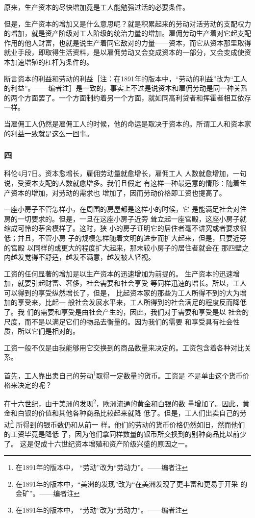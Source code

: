 \documentclass[a4paper,twoside,12pt,AutoFakeBold]{ctexart}
\begin{document}
原来，生产资本的尽快增加竟是工人能勉强过活的必要条件。

但是，生产资本的增加又是什么意思呢？就是积累起来的劳动对活劳动的支配权力的增加，就是资产阶级对工人阶级的统治力量的增加。雇佣劳动生产着对它起支配作用的他人财富，也就是说生产着同它敌对的力量——资本，而它从资本那里取得就业手段，即取得生活资料，是以雇佣劳动又会变成资本的一部分，又会变成使资本加速增殖的杠杆为条件的。

断言资本的利益和劳动的利益［注：在1891年的版本中，“劳动的利益”改为“工人的利益”。——编者注］是一致的，事实上不过是说资本和雇佣劳动是同一种关系的两个方面罢了。一个方面制约着另一个方面，就如同高利贷者和挥霍者相互依存一样。

当雇佣工人仍然是雇佣工人的时候，他的命运是取决于资本的。所谓工人和资本家的利益一致就是这么一回事。

\subsubsection{四}
科伦4月7日。资本愈增长，雇佣劳动量就愈增长，雇佣工人
人数就愈增加，一句说，受资本支配的人数就愈增多。我们且假定
有这样一种最适意的情形：随着生产资本的增加，对劳动的需求也
增加了，因而劳动价格即工资也提高了。

一座小房子不管怎样小，在周围的房屋都是这样小的时候，它
是能满足社会对住房的一切要求的。但是，一旦在这座小房子近旁
耸立起一座宫殿，这座小房子就缩成可怜的茅舍模样了。这时，狭
小的房子证明它的居住者毫不讲究或者要求很低；并且，不管小房
子的规模怎样随着文明的进步而扩大起来，但是，只要近旁的宫殿
以同样的或更大的程度扩大起来，那末较小房子的居住者就会在
那四壁之内越发觉得不舒适，越发不满意，越发被人轻视。

工资的任何显著的增加是以生产资本的迅速增加为前提的。
生产资本的迅速增加，就要引起财富、奢侈，社会需要和社会享受
等同样迅速的增长。所以，工人可以得到的享受纵然增长了，但是，
比起资本家的那些为工人所得不到的大为增加的享受来，比起一
般社会发展水平来，工人所得到的社会满足的程度反而降低了。我
们的需要和享受是由社会产生的，因此，我们对于需要和享受是以
社会的尺度，而不是以满足它们的物品去衡量的。因为我们的需要
和享受具有社会性质，所以它们是相对的。

工资一般不仅是由我能够用它交换到的商品数量来决定的。工资包含着各种对比关系。

首先，工人靠出卖自己的劳动\footnote{在1891年的版本中， “劳动”改为“劳动力”。——编者注}取得一定数量的货币。工资是
不是单由这个货币价格来决定的呢？

在十六世纪，由于美洲的发现\footnote{在1891年的版本中，“美洲的发现”改为“在美洲发现了更丰富和更易于开采
的金矿”。——编者注}，欧洲流通的黄金和白银的数
量增加了。因此，黄金和白银的价值和其他各种商品比较起来就降
低了。但是，工人们出卖自己的劳动\footnote{在1891年的版本中， “劳动”改为“劳动力”。——编者注} 所得到的银币数仍和从前一
样。他们的劳动的货币价格仍然如旧，然而他们的工资毕竟是降低
了，因为他们拿同样数量的银币所交换到的别种商品比以前少了。
这是促成十六世纪资本增殖和资产阶级兴盛的原因之一。
\end{document}
